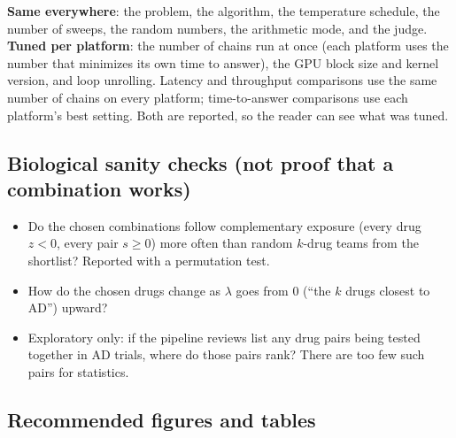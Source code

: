 \textbf{Same everywhere}: the problem, the algorithm, the temperature schedule, the number of sweeps, the random numbers, the arithmetic mode, and the judge. \textbf{Tuned per platform}: the number of chains run at once (each platform uses the number that minimizes its own time to answer), the GPU block size and kernel version, and loop unrolling. Latency and throughput comparisons use the same number of chains on every platform; time-to-answer comparisons use each platform's best setting. Both are reported, so the reader can see what was tuned.

\subsection{Biological sanity checks (not proof that a combination works)}

\begin{itemize}
\item Do the chosen combinations follow complementary exposure (every drug $z<0$, every pair $s\ge 0$) more often than random $k$-drug teams from the shortlist? Reported with a permutation test.
\item How do the chosen drugs change as $\lambda$ goes from 0 (``the $k$ drugs closest to AD'') upward?
\item Exploratory only: if the pipeline reviews \cite{cummings2025pipeline,cummings2026pipeline} list any drug pairs being tested together in AD trials, where do those pairs rank? There are too few such pairs for statistics.
\end{itemize}

\subsection{Recommended figures and tables}


